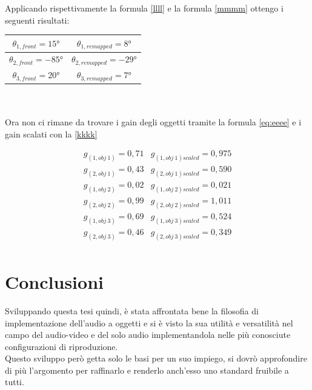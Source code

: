 \documentclass[12pt,a4paper]{report}
\begin{document}
Applicando rispettivamente la formula \ref{llll} e la formula \ref{mmmm} ottengo i seguenti risultati:\\


\begin{tabular}{|c|c|}
\hline 
$\theta_{1,front} = 15°$     & $\theta_{1,remapped} =  8°  $   \\ 
\hline 
$\theta_{2,front} = -85°$     & $\theta_{2,remapped} = -29° $     \\
\hline  
$\theta_{3,front} = 20°$    & $ \theta_{3,remapped} =  7° $    \\
\hline
\end{tabular} \\
\\

Ora non ci rimane da trovare i gain degli oggetti tramite la formula \ref{eq:eeee} e i gain scalati con la \ref{kkkk}

\begin{equation}
\begin{matrix}
g_{(1,obj\ 1)} = 0,71 & g_{(1,obj\ 1)scaled} = 0,975\\ 
g_{(2,obj\ 1)} = 0,43 & g_{(2,obj\ 1)scaled} = 0,590\\
g_{(1,obj\ 2)} = 0,02 & g_{(1,obj\ 2)scaled} = 0,021\\
g_{(2,obj\ 2)} = 0,99 & g_{(2,obj\ 2)scaled} = 1,011\\
g_{(1,obj\ 3)} = 0,69 & g_{(1,obj\ 3)scaled} = 0,524\\
g_{(2,obj\ 3)} = 0,46 & g_{(2,obj\ 3)scaled} = 0,349\\
\end{matrix} 
\label{gscalatiesempio3}
\end{equation}










\chapter*{Conclusioni}

Sviluppando questa tesi quindi, è stata affrontata bene la filosofia di implementazione dell'audio a oggetti e si è visto la sua utilità e versatilità nel campo del audio-video e del solo audio implementandola nelle più conosciute configurazioni di riproduzione.\\

Questo sviluppo però getta solo le basi per un suo impiego, si dovrò approfondire di più l'argomento per raffinarlo e renderlo anch'esso uno standard fruibile a tutti.\\
\end{document}
